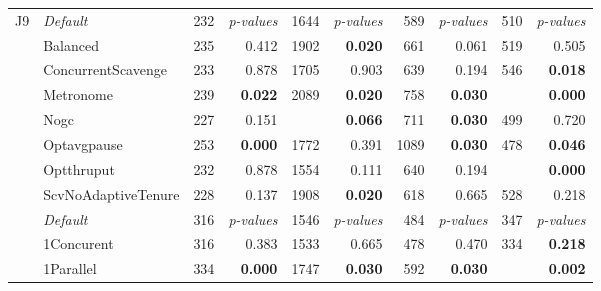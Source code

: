 \begin{table*}
{\begin{tabular}{cl|rr|rr|rr|rr}
			\hline
			\multirow{9}{*}{J9}
			    & \em Default         & 232                     & \em p-values                 & 1644                         & \em p-values                & 589        & \em p-values & 510        & \em p-values \\
			    & Balanced            & 235                     & 0.412                        & 1902                         & \bf 0.020                   & 661        & 0.061        & 519        & 0.505        \\
			    & ConcurrentScavenge  & 233                     & 0.878                        & 1705                         & 0.903                       & 639        & 0.194        & 546        & \bf 0.018    \\
			    & Metronome           & 239                     & \bf 0.022                    & 2089                         & \bf 0.020                   & 758        & \bf 0.030    & \best 422  & \bf 0.000    \\
			    & Nogc                & 227                     & 0.151                        & \best 1505                   & \bf 0.066                   & 711        & \bf 0.030    & 499        & 0.720        \\
			    & Optavgpause         & 253                     & \bf 0.000                    & 1772                         & 0.391                       & 1089       & \bf 0.030    & 478        & \bf 0.046    \\
			    & Optthruput          & 232                     & 0.878                        & 1554                         & 0.111                       & 640        & 0.194        & \best 429  & \bf 0.000    \\
			    & ScvNoAdaptiveTenure & 228                     & 0.137                        & 1908                         & \bf0.020                    & 618        & 0.665        & 528        & 0.218        \\
			\hline
			\multirow{11}{*}{\sc HotSpot}
			    & \em Default         & 316                     & \em p-values                 & 1546                         & \em p-values                & 484        & \em p-values & 347        & \em p-values \\
			    & 1Concurent          & 316                     & 0.383                        & 1533                         & 0.665                       & 478        & 0.470        & 334        & \bf 0.218    \\
			    & 1Parallel           & 334                     & \bf 0.000                    & 1747                         & \bf 0.030                   & 592        & \bf 0.030    & \best  320 & \bf 0.002    \\

\end{tabular}}
\end{table*}

